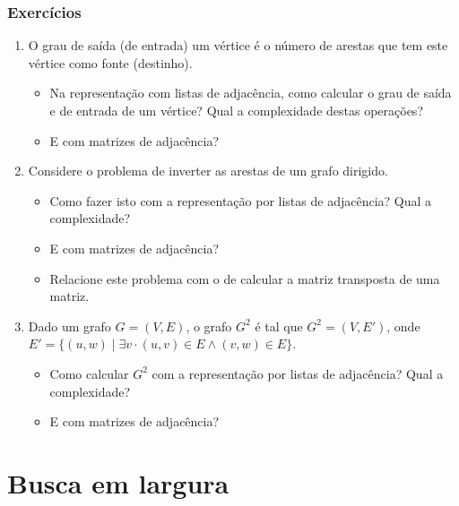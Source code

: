 \documentclass{beamer}
\begin{document}
\begin{frame}

\frametitle{Exercícios}

\begin{enumerate}
\item O grau de saída (de entrada) um vértice é o número de arestas que tem este vértice como fonte (destinho).
\begin{itemize}
\item Na representação com listas de adjacência, como calcular o grau de saída e de entrada de um vértice? Qual a complexidade destas operações?
\item E com matrizes de adjacência?
\end{itemize}
\item Considere o problema de inverter as arestas de um grafo dirigido.
\begin{itemize}
\item Como fazer isto com a representação por listas de adjacência? Qual a complexidade?
\item E com matrizes de adjacência?
\item Relacione este problema com o de calcular a matriz transposta de uma matriz.
\end{itemize}
\item Dado um grafo $G = (V, E)$, o grafo $G^2$ é tal que $G^2 = (V, E')$, onde
$E' = \{ (u, w) \mid \exists v \cdot (u, v) \in E \land (v, w) \in E \}$.
\begin{itemize}
\item Como calcular $G^2$ com a representação por listas de adjacência? Qual a complexidade?
\item E com matrizes de adjacência?
\end{itemize}
\end{enumerate}

\end{frame}

\section{Busca em largura}
\end{document}
